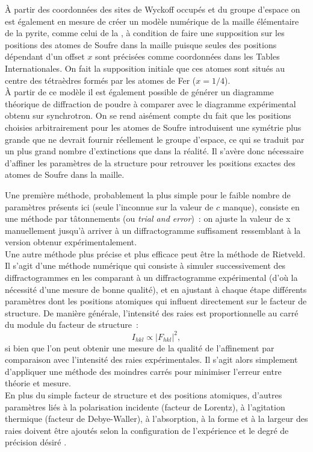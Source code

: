 À partir des coordonnées des sites de Wyckoff occupés et du groupe d'espace on est également en mesure de créer un modèle numérique de la maille élémentaire de la pyrite, comme celui de la , à condition de faire une supposition sur les positions des atomes de Soufre dans la maille puisque seules des positions dépendant d'un offset \(x\) sont précisées comme coordonnées dans les Tables Internationales.
On fait la supposition initiale que ces atomes sont situés au centre des tétraèdres formés par les atomes de Fer (\(x = 1/4\)).\\
À partir de ce modèle il est également possible de générer un diagramme théorique de diffraction de poudre à comparer avec le diagramme expérimental obtenu sur synchrotron.
On se rend aisément compte du fait que les positions choisies arbitrairement pour les atomes de Soufre introduisent une symétrie plus grande que ne devrait fournir réellement le groupe d'espace, ce qui se traduit par un plus grand nombre d'extinctions que dans la réalité.
Il s'avère donc nécessaire d'affiner les paramètres de la structure pour retrouver les positions exactes des atomes de Soufre dans la maille.

Une première méthode, probablement la plus simple pour le faible nombre de paramètres présents ici (seule l'inconnue sur la valeur de \(c\) manque), consiste en une méthode par tâtonnements (ou \textit{trial and error})~: on ajuste la valeur de x manuellement jusqu'à arriver à un diffractogramme suffisament ressemblant à la version obtenur expérimentalement.\\
Une autre méthode plus précise et plus efficace peut être la méthode de Rietveld. Il s'agit d'une méthode numérique qui consiste à simuler successivement des diffractogrammes en les comparant à un diffractogramme expérimental (d'où la nécessité d'une mesure de bonne qualité), et en ajustant à chaque étape différents paramètres dont les positions atomiques qui influent directement sur le facteur de structure.
De manière générale, l'intensité des raies est proportionnelle au carré du module du facteur de structure~:
\begin{equation}
I_{hkl} \propto \left| F_{hkl} \right|^2,
\end{equation}
si bien que l'on peut obtenir une mesure de la qualité de l'affinement par comparaison avec l'intensité des raies expérimentales.
Il s'agit alors simplement d'appliquer une méthode des moindres carrés pour minimiser l'erreur entre théorie et mesure.\\
En plus du simple facteur de structure et des positions atomiques, d'autres paramètres liés à la polarisation incidente (facteur de Lorentz), à l'agitation thermique (facteur de Debye-Waller), à l'absorption, à la forme et à la largeur des raies doivent être ajoutés selon la configuration de l'expérience et le degré de précision désiré \cite{AlbinatiIUCr2006}.

